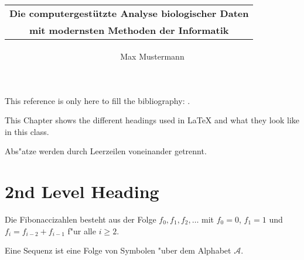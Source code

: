 \documentclass[twoside,a4paper,bsc]{master}
\newcommand{\Alphabet}{\mathcal{A}\xspace}
\begin{document}

\author{Max Mustermann}
\title{
       \begin{tabular}{c}
       \textbf{Die computergest{\"u}tzte Analyse biologischer Daten}\\[3mm]
       \textbf{mit modernsten Methoden der Informatik}
       \end{tabular}}
\Maketitle

\small
\lipsum[1] %

This reference is only here to fill the bibliography: \cite{articleex}.
\normalsize

\setcounter{tocdepth}{1}
\tableofcontents




This Chapter shows the different headings used in
\LaTeX{} and what they look like in this class.

Abs"atze werden durch Leerzeilen voneinander getrennt.

\lipsum[2]

\section{2nd Level Heading}
\lipsum[3]

\begin{Definition}[Fibonaccizahlen]
Die Fibonaccizahlen besteht aus der Folge \(f_{0},f_{1},f_{2},\ldots\) mit
\(f_{0}=0\), \(f_{1}=1\) und \(f_{i}=f_{i-2}+f_{i-1}\) f"ur alle \(i\geq 2\).
\end{Definition}

\lipsum[4]

\begin{Definition}
Eine Sequenz ist eine Folge von Symbolen "uber dem Alphabet \(\Alphabet\).
\end{Definition}
\end{document}
